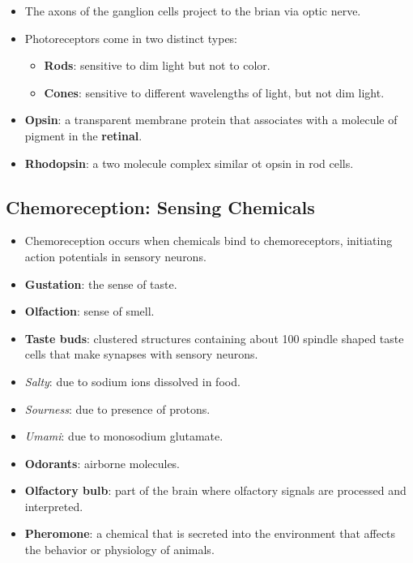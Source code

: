 \documentclass[12pt,a4paper]{article}
\begin{document}
\begin{itemize}
\begin{itemize}
            \item The axons of the ganglion cells project to the brian via optic nerve.
            \item Photoreceptors come in two distinct types:
                \begin{itemize}
                    \item \textbf{Rods}: sensitive to dim light but not to color.
                    \item \textbf{Cones}: sensitive to different wavelengths of light, but not dim light.
                \end{itemize}
            \item \textbf{Opsin}: a transparent membrane protein that associates with a molecule of pigment in the \textbf{retinal}.
            \item \textbf{Rhodopsin}: a two molecule complex similar ot opsin in rod cells. 
        \end{itemize}
\end{itemize}

\subsection{Chemoreception: Sensing Chemicals}
\begin{itemize}
    \item Chemoreception occurs when chemicals bind to chemoreceptors, initiating action potentials in sensory neurons.
    \item \textbf{Gustation}: the sense of taste.
    \item \textbf{Olfaction}: sense of smell.
    \item \textbf{Taste buds}: clustered structures containing about 100 spindle shaped taste cells that make synapses with sensory neurons.
    \item \textit{Salty}: due to sodium ions dissolved in food.
    \item \textit{Sourness}: due to presence of protons.
    \item \textit{Umami}: due to monosodium glutamate. 
    \item \textbf{Odorants}: airborne molecules.
    \item \textbf{Olfactory bulb}: part of the brain where olfactory signals are processed and interpreted.
    \item \textbf{Pheromone}: a chemical that is secreted into the environment that affects the behavior or physiology of animals.
\end{itemize}
\end{document}
